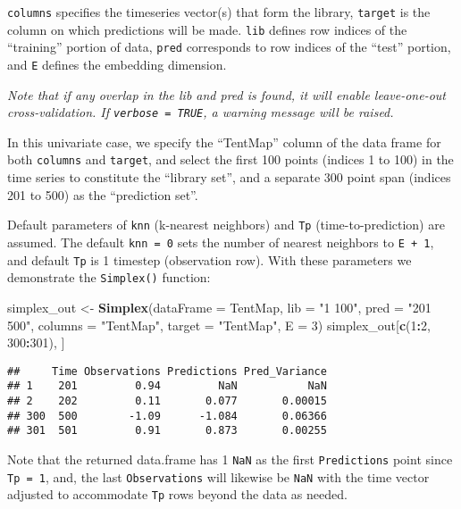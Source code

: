 \documentclass[]{article}
\newenvironment{Shaded}{\begin{snugshade}}{\end{snugshade}}
\newcommand{\DataTypeTok}[1]{\textcolor[rgb]{0.13,0.29,0.53}{#1}}
\newcommand{\DecValTok}[1]{\textcolor[rgb]{0.00,0.00,0.81}{#1}}
\newcommand{\KeywordTok}[1]{\textcolor[rgb]{0.13,0.29,0.53}{\textbf{#1}}}
\newcommand{\NormalTok}[1]{#1}
\newcommand{\OperatorTok}[1]{\textcolor[rgb]{0.81,0.36,0.00}{\textbf{#1}}}
\newcommand{\StringTok}[1]{\textcolor[rgb]{0.31,0.60,0.02}{#1}}
\begin{document}
\texttt{columns} specifies the timeseries vector(s) that form the
library, \texttt{target} is the column on which predictions will be
made. \texttt{lib} defines row indices of the ``training'' portion of
data, \texttt{pred} corresponds to row indices of the ``test'' portion,
and \texttt{E} defines the embedding dimension.

\emph{Note that if any overlap in the lib and pred is found, it will
enable leave-one-out cross-validation. If \texttt{verbose\ =\ TRUE}, a
warning message will be raised.}

In this univariate case, we specify the ``TentMap'' column of the data
frame for both \texttt{columns} and \texttt{target}, and select the
first 100 points (indices 1 to 100) in the time series to constitute the
``library set'', and a separate 300 point span (indices 201 to 500) as
the ``prediction set''.

Default parameters of \texttt{knn} (k-nearest neighbors) and \texttt{Tp}
(time-to-prediction) are assumed. The default \texttt{knn\ =\ 0} sets
the number of nearest neighbors to \texttt{E\ +\ 1}, and default
\texttt{Tp} is 1 timestep (observation row). With these parameters we
demonstrate the \texttt{Simplex()} function:

\begin{Shaded}
\begin{Highlighting}[]
\NormalTok{simplex_out <-}\StringTok{ }\KeywordTok{Simplex}\NormalTok{(}\DataTypeTok{dataFrame =}\NormalTok{ TentMap, }\DataTypeTok{lib =} \StringTok{"1 100"}\NormalTok{, }\DataTypeTok{pred =} \StringTok{"201 500"}\NormalTok{, }\DataTypeTok{columns =} \StringTok{"TentMap"}\NormalTok{, }
    \DataTypeTok{target =} \StringTok{"TentMap"}\NormalTok{, }\DataTypeTok{E =} \DecValTok{3}\NormalTok{)}
\NormalTok{simplex_out[}\KeywordTok{c}\NormalTok{(}\DecValTok{1}\OperatorTok{:}\DecValTok{2}\NormalTok{, }\DecValTok{300}\OperatorTok{:}\DecValTok{301}\NormalTok{), ]}
\end{Highlighting}
\end{Shaded}

\begin{verbatim}
##     Time Observations Predictions Pred_Variance
## 1    201         0.94         NaN           NaN
## 2    202         0.11       0.077       0.00015
## 300  500        -1.09      -1.084       0.06366
## 301  501         0.91       0.873       0.00255
\end{verbatim}

Note that the returned data.frame has 1 \texttt{NaN} as the first
\texttt{Predictions} point since \texttt{Tp\ =\ 1}, and, the last
\texttt{Observations} will likewise be \texttt{NaN} with the time vector
adjusted to accommodate \texttt{Tp} rows beyond the data as needed.
\end{document}
